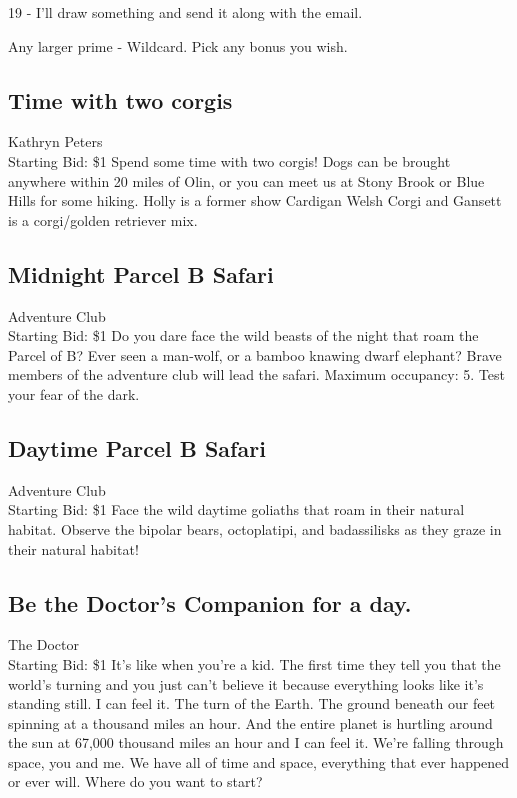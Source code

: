 \documentclass[11pt]{article}
\begin{document}
19 - I'll draw something and send it along with the email.

Any larger prime - Wildcard. Pick any bonus you wish.
\subsection{Time with two corgis}
Kathryn Peters
\\
Starting Bid: \$1
\newline
Spend some time with two corgis! Dogs can be brought anywhere within 20 miles of Olin, or you can meet us at Stony Brook or Blue Hills for some hiking. Holly is a former show Cardigan Welsh Corgi and Gansett is a corgi/golden retriever mix.
\subsection{Midnight Parcel B Safari}
Adventure Club
\\
Starting Bid: \$1
\newline
Do you dare face the wild beasts of the night that roam the Parcel of B? Ever seen a man-wolf, or a bamboo knawing dwarf elephant? Brave members of the adventure club will lead the safari. Maximum occupancy: 5. Test your fear of the dark.
\subsection{Daytime Parcel B Safari}
Adventure Club
\\
Starting Bid: \$1
\newline
Face the wild daytime goliaths that roam in their natural habitat. Observe the bipolar bears, octoplatipi, and badassilisks as they graze in their natural habitat!
\subsection{Be the Doctor's Companion for a day.}
The Doctor
\\
Starting Bid: \$1
\newline
It's like when you're a kid. The first time they tell you that the world's turning and you just can't believe it because everything looks like it's standing still. I can feel it. The turn of the Earth. The ground beneath our feet spinning at a thousand miles an hour. And the entire planet is hurtling around the sun at 67,000 thousand miles an hour and I can feel it. We're falling through space, you and me. 
We have all of time and space, everything that ever happened or ever will. Where do you want to start?
\end{document}
